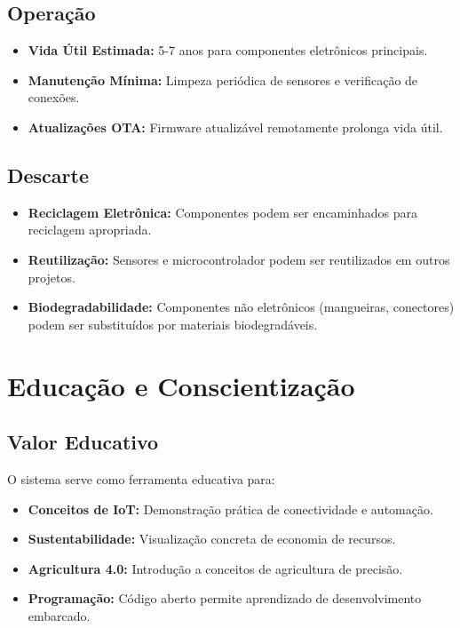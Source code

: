 \subsection{Operação}
\begin{itemize}
    \item \textbf{Vida Útil Estimada:} 5-7 anos para componentes eletrônicos principais.
    \item \textbf{Manutenção Mínima:} Limpeza periódica de sensores e verificação de conexões.
    \item \textbf{Atualizações OTA:} Firmware atualizável remotamente prolonga vida útil.
\end{itemize}

\subsection{Descarte}
\begin{itemize}
    \item \textbf{Reciclagem Eletrônica:} Componentes podem ser encaminhados para reciclagem apropriada.
    \item \textbf{Reutilização:} Sensores e microcontrolador podem ser reutilizados em outros projetos.
    \item \textbf{Biodegradabilidade:} Componentes não eletrônicos (mangueiras, conectores) podem ser substituídos por materiais biodegradáveis.
\end{itemize}

\section{Educação e Conscientização}

\subsection{Valor Educativo}
O sistema serve como ferramenta educativa para:
\begin{itemize}
    \item \textbf{Conceitos de IoT:} Demonstração prática de conectividade e automação.
    \item \textbf{Sustentabilidade:} Visualização concreta de economia de recursos.
    \item \textbf{Agricultura 4.0:} Introdução a conceitos de agricultura de precisão.
    \item \textbf{Programação:} Código aberto permite aprendizado de desenvolvimento embarcado.
\end{itemize}

